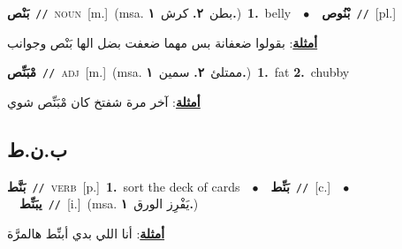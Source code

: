 \documentclass[10pt,a4paper,twoside]{article} %
\begin{document}
\begin{multicols}{2}
{\setlength\topsep{0pt}\textbf{\foreignlanguage{arabic}{بَنْص}}\ {\color{gray}\texttt{//}\color{black}}\ \textsc{noun}\ [m.]\ \color{gray}(msa. \foreignlanguage{arabic}{بطن}~\foreignlanguage{arabic}{\textbf{٢.}}  \foreignlanguage{arabic}{كرش}~\foreignlanguage{arabic}{\textbf{١.}})\color{black}\ \textbf{1.}~belly\ \ $\bullet$\ \ \setlength\topsep{0pt}\textbf{\foreignlanguage{arabic}{بْنُوص}}\ {\color{gray}\texttt{//}\color{black}}\ [pl.]\  \begin{flushright}\color{gray}\foreignlanguage{arabic}{\textbf{\underline{\foreignlanguage{arabic}{أمثلة}}}: بقولوا ضعفانة بس مهما ضعفت بضل الها بَنْص وجوانب}\end{flushright}\color{black}} \vspace{2mm}

{\setlength\topsep{0pt}\textbf{\foreignlanguage{arabic}{مْبَنِّص}}\ {\color{gray}\texttt{//}\color{black}}\ \textsc{adj}\ [m.]\ \color{gray}(msa. \foreignlanguage{arabic}{ممتلئ}~\foreignlanguage{arabic}{\textbf{٢.}}  \foreignlanguage{arabic}{سمين}~\foreignlanguage{arabic}{\textbf{١.}})\color{black}\ \textbf{1.}~fat  \textbf{2.}~chubby\  \begin{flushright}\color{gray}\foreignlanguage{arabic}{\textbf{\underline{\foreignlanguage{arabic}{أمثلة}}}: آخر مرة شفتخ كان مْبَنِّص شوي}\end{flushright}\color{black}} \vspace{2mm}

\vspace{-3mm}
\subsection*{\color{blue}\foreignlanguage{arabic}{ب.ن.ط}\color{blue}{}} 

{\setlength\topsep{0pt}\textbf{\foreignlanguage{arabic}{بَنَّط}}\ {\color{gray}\texttt{//}\color{black}}\ \textsc{verb}\ [p.]\ \textbf{1.}~sort the deck of cards\ \ $\bullet$\ \ \setlength\topsep{0pt}\textbf{\foreignlanguage{arabic}{بَنِّط}}\ {\color{gray}\texttt{//}\color{black}}\ [c.]\ \ $\bullet$\ \ \setlength\topsep{0pt}\textbf{\foreignlanguage{arabic}{يبَنِّط}}\ {\color{gray}\texttt{//}\color{black}}\ [i.]\ \color{gray}(msa. \foreignlanguage{arabic}{يَفْرِز الورق}~\foreignlanguage{arabic}{\textbf{١.}})\color{black}\  \begin{flushright}\color{gray}\foreignlanguage{arabic}{\textbf{\underline{\foreignlanguage{arabic}{أمثلة}}}: أنا اللي بدي أبنِّط هالمرَّة}\end{flushright}\color{black}} \vspace{2mm}


\end{multicols}
\end{document}
